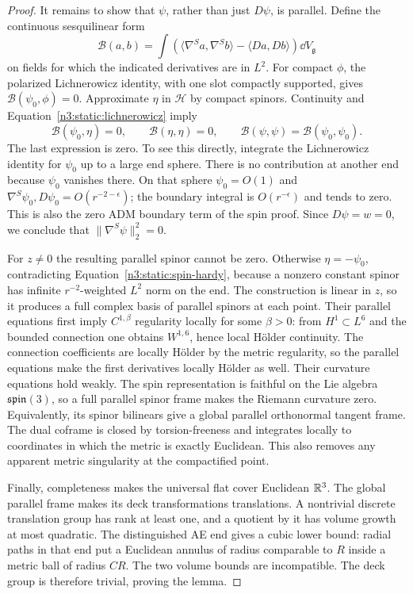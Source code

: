 \begin{proof}
It remains to show that \(\psi\), rather than just \(D\psi\), is
parallel. Define the continuous sesquilinear form
\[
\mathcal B(a,b)=
\int\left(\langle\nabla^Sa,\nabla^Sb\rangle
-\langle Da,Db\rangle\right)\dd V_{\mathfrak g}
\]
on fields for which the indicated derivatives are in \(L^2\).
For compact \(\phi\), the polarized Lichnerowicz identity,
with one slot compactly supported, gives
\(\mathcal B(\psi_0,\phi)=0\).
Approximate \(\eta\) in \(\mathcal H\) by compact spinors.
Continuity and Equation~\eqref{n3:static:lichnerowicz} imply
\[
\mathcal B(\psi_0,\eta)=0,\qquad
\mathcal B(\eta,\eta)=0,\qquad
\mathcal B(\psi,\psi)=\mathcal B(\psi_0,\psi_0).
\]
The last expression is zero. To see this directly, integrate the
Lichnerowicz identity for \(\psi_0\) up to a large end sphere.
There is no contribution at another end because \(\psi_0\)
vanishes there. On that sphere \(\psi_0=O(1)\) and
\(\nabla^S\psi_0,D\psi_0=O(r^{-2-\epsilon})\);
the boundary integral is \(O(r^{-\epsilon})\) and tends to zero.
This is also the zero ADM boundary term of the spin proof.
Since \(D\psi=w=0\), we conclude that
\(\|\nabla^S\psi\|_2^2=0\).

For \(z\ne0\) the resulting parallel spinor cannot be zero.
Otherwise \(\eta=-\psi_0\), contradicting
Equation~\eqref{n3:static:spin-hardy}, because a nonzero constant
spinor has infinite \(r^{-2}\)-weighted \(L^2\) norm on the end.
The construction is linear in \(z\), so it produces a full
complex basis of parallel spinors at each point.
Their parallel equations first imply \(C^{1,\beta}\) regularity
locally for some \(\beta>0\): from \(H^1\subset L^6\) and the
bounded connection one obtains \(W^{1,6}\), hence local Hölder
continuity. The connection coefficients are locally Hölder by the
metric regularity, so the parallel equations make the first
derivatives locally Hölder as well.
Their curvature equations hold weakly.
The spin representation is faithful on the Lie algebra
\(\mathfrak{spin}(3)\), so a full parallel spinor frame makes
the Riemann curvature zero.
Equivalently, its spinor bilinears give a global parallel
orthonormal tangent frame.
The dual coframe is closed by torsion-freeness and integrates
locally to coordinates in which the metric is exactly Euclidean.
This also removes any apparent metric singularity at the
compactified point.

Finally, completeness makes the universal flat cover Euclidean
\(\mathbb R^3\). The global parallel frame makes its deck transformations
translations. A nontrivial discrete translation group has rank
at least one, and a quotient by it has volume growth at most
quadratic. The distinguished AE end gives a cubic lower bound:
radial paths in that end put a Euclidean annulus of radius
comparable to \(R\) inside a metric ball of radius \(CR\).
The two volume bounds are incompatible.
The deck group is therefore trivial, proving the lemma.
\end{proof}

